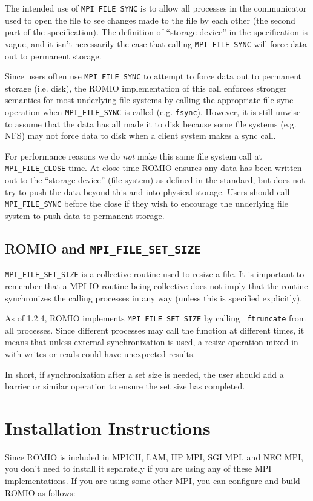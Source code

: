 The intended use of {\tt MPI\_FILE\_SYNC} is to allow all processes in the
communicator used to open the file to see changes made to the file by each
other (the second part of the specification).  The definition of ``storage
device'' in the specification is vague, and it isn't necessarily the case that
calling {\tt MPI\_FILE\_SYNC} will force data out to permanent storage.

Since users often use {\tt MPI\_FILE\_SYNC} to attempt to force data out to
permanent storage (i.e. disk), the ROMIO implementation of this call enforces
stronger semantics for most underlying file systems by calling the appropriate
file sync operation when {\tt MPI\_FILE\_SYNC} is called (e.g. {\tt fsync}).
However, it is still unwise to assume that the data has all made it to disk
because some file systems (e.g. NFS) may not force data to disk when a client
system makes a sync call.

For performance reasons we do \emph{not} make this same file system call at
{\tt MPI\_FILE\_CLOSE} time.  At close time ROMIO ensures any data has been
written out to the ``storage device'' (file system) as defined in the
standard, but does not try to push the data beyond this and into physical
storage. Users should call {\tt MPI\_FILE\_SYNC} before the close if they wish
to encourage the underlying file system to push data to permanent storage.

\subsection{ROMIO and {\tt MPI\_FILE\_SET\_SIZE}}

{\tt MPI\_FILE\_SET\_SIZE} is a collective routine used to resize a file.  It
is important to remember that a MPI-IO routine being collective does not imply
that the routine synchronizes the calling processes in any way (unless this is
specified explicitly).

As of 1.2.4, ROMIO implements {\tt MPI\_FILE\_SET\_SIZE} by calling {\tt
ftruncate} from all processes.  Since different processes may call the
function at different times, it means that unless external synchronization is
used, a resize operation mixed in with writes or reads could have unexpected
results.

In short, if synchronization after a set size is needed, the user should add a
barrier or similar operation to ensure the set size has completed.


%
%
\section{Installation Instructions}
Since ROMIO is included in MPICH, LAM, HP MPI, SGI MPI, and NEC MPI, you don't
need to install it separately if you are using any of these MPI
implementations. If you are using some other MPI, you
can configure and build ROMIO as follows: 

